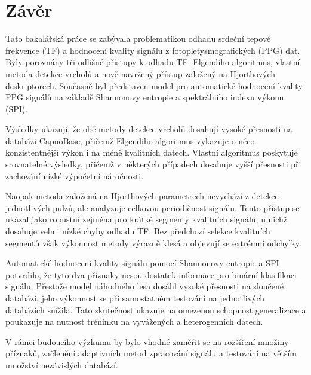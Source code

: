 
\chapter*{Závěr} %
{}
\label{chap:zaver}
Tato bakalářská práce se zabývala problematikou odhadu srdeční tepové frekvence (\acs{TF}) a hodnocení kvality signálu z fotopletysmografických (\acs{PPG}) dat.
Byly porovnány tři odlišné přístupy k odhadu TF: Elgendiho algoritmus, vlastní metoda detekce vrcholů a nově navržený přístup založený na Hjorthových deskriptorech.
Současně byl představen model pro automatické hodnocení kvality PPG signálů na základě Shannonovy entropie a spektrálního indexu výkonu (\acs{SPI}).

Výsledky ukazují, že obě metody detekce vrcholů dosahují vysoké přesnosti na databázi CapnoBase, přičemž Elgendiho algoritmus vykazuje o něco konzistentnější výkon i na méně kvalitních datech.
Vlastní algoritmus poskytuje srovnatelné výsledky, přičemž v některých případech dosahuje vyšší přesnosti při zachování nízké výpočetní náročnosti.

Naopak metoda založená na Hjorthových parametrech nevychází z detekce jednotlivých pulzů, ale analyzuje celkovou periodičnost signálu.
Tento přístup se ukázal jako robustní zejména pro krátké segmenty kvalitních signálů, u nichž dosahuje velmi nízké chyby odhadu TF.
Bez předchozí selekce kvalitních segmentů však výkonnost metody výrazně klesá a objevují se extrémní odchylky.

Automatické hodnocení kvality signálu pomocí Shannonovy entropie a \acs{SPI} potvrdilo, že tyto dva příznaky nesou dostatek informace pro binární klasifikaci signálu.
Přestože model náhodného lesa dosáhl vysoké přesnosti na sloučené databázi, jeho výkonnost se při samostatném testování na jednotlivých databázích snížila.
Tato skutečnost ukazuje na omezenou schopnost generalizace a poukazuje na nutnost tréninku na vyvážených a heterogenních datech.

V rámci budoucího výzkumu by bylo vhodné zaměřit se na rozšíření množiny příznaků, začlenění adaptivních metod zpracování signálu a testování na větším množství nezávislých databází.

